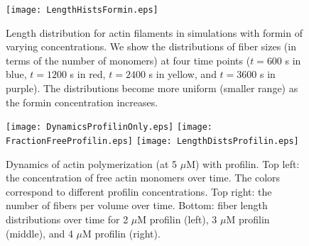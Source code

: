 \documentclass[11pt]{article}
\begin{document}
\begin{appendices}
\begin{figure}
\centering
\texttt{[image: LengthHistsFormin.eps]}
\caption{\label{fig:HistsWithFormin}Length distribution for actin filaments in simulations with formin of varying concentrations. We show the distributions of fiber sizes (in terms of the number of monomers) at four time points ($t=600$ s in blue, $t=1200$ s in red, $t=2400$ s in yellow, and $t=3600$ s in purple). The distributions become more uniform (smaller range) as the formin concentration increases.}
\end{figure}

\begin{figure}
\centering
\texttt{[image: DynamicsProfilinOnly.eps]}
\texttt{[image: FractionFreeProfilin.eps]}
\texttt{[image: LengthDistsProfilin.eps]}
\caption{\label{fig:ActinProfilin}Dynamics of actin polymerization (at 5 $\mu$M) with profilin. Top left: the concentration of free actin monomers over time. The colors correspond to different profilin concentrations. Top right: the number of fibers per volume over time. Bottom: fiber length distributions over time for 2 $\mu$M profilin (left), 3 $\mu$M profilin (middle), and 4 $\mu$M profilin (right).}
\end{figure}

\end{appendices}






\end{document}
